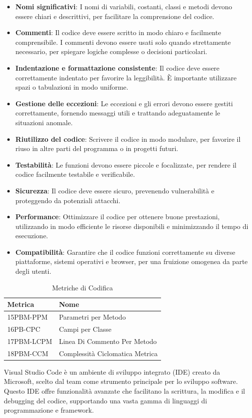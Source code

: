\begin{itemize}
  \item \textbf{Nomi significativi}: I nomi di variabili, costanti, classi e metodi devono essere chiari e descrittivi, per facilitare la comprensione del codice.
  \item \textbf{Commenti}: Il codice deve essere scritto in modo chiaro e facilmente comprensibile. I commenti devono essere usati solo quando strettamente necessario, per spiegare logiche complesse o decisioni particolari.
  \item \textbf{Indentazione e formattazione consistente}: Il codice deve essere correttamente indentato per favorire la leggibilità. È importante utilizzare spazi o tabulazioni in modo uniforme.
  \item \textbf{Gestione delle eccezioni}: Le eccezioni e gli errori devono essere gestiti correttamente, fornendo messaggi utili e trattando adeguatamente le situazioni anomale.
  \item \textbf{Riutilizzo del codice}: Scrivere il codice in modo modulare, per favorire il riuso in altre parti del programma o in progetti futuri.
  \item \textbf{Testabilità}: Le funzioni devono essere piccole e focalizzate, per rendere il codice facilmente testabile e verificabile.
  \item \textbf{Sicurezza}: Il codice deve essere sicuro, prevenendo vulnerabilità e proteggendo da potenziali attacchi.
  \item \textbf{Performance}: Ottimizzare il codice per ottenere buone prestazioni, utilizzando in modo efficiente le risorse disponibili e minimizzando il tempo di esecuzione.
  \item \textbf{Compatibilità}: Garantire che il codice funzioni correttamente su diverse piattaforme, sistemi operativi e browser, per una fruizione omogenea da parte degli utenti.
\end{itemize}

\begin{table}[h!]
    \centering
    \renewcommand{\arraystretch}{1.5}
    \begin{tabular}{|l|l|}
        \hline
        \textbf{Metrica} & \textbf{Nome} \\
        \hline
        15PBM-PPM & Parametri per Metodo \\
        \hline
        16PB-CPC & Campi per Classe \\
        \hline
        17PBM-LCPM & Linea Di Commento Per Metodo \\
        \hline
        18PBM-CCM & Complessità Ciclomatica Metrica \\
        \hline
    \end{tabular}
    \caption{Metriche di Codifica}
    \label{tab:metriches_codifica}
\end{table}


Visual Studio Code è un ambiente di sviluppo integrato (IDE) creato da Microsoft, scelto dal team come strumento principale per lo sviluppo software. Questo IDE offre funzionalità avanzate che facilitano la scrittura, la modifica e il debugging del codice, supportando una vasta gamma di linguaggi di programmazione e framework.

